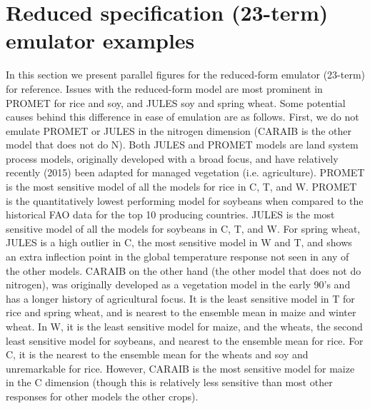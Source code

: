 \documentclass[12pt]{article}
\begin{document}
{{\section{Reduced specification (23-term) emulator examples}
\smallskip
\begin{flushleft}
In this section we present parallel figures for the reduced-form emulator (23-term) for reference. 
Issues with the reduced-form model are most prominent in PROMET for rice and soy, and JULES soy and spring wheat. 
Some potential causes behind this difference in ease of emulation are as follows.
First, we do not emulate PROMET or JULES in the nitrogen dimension (CARAIB is the other model that does not do N). 
Both JULES and PROMET models are land system process models, originally developed with a broad focus, and have relatively recently (2015) been adapted for managed vegetation (i.e. agriculture).
PROMET is the most sensitive model of all the models for rice in C, T, and W. 
PROMET is the quantitatively lowest performing model for soybeans when compared to the historical FAO data for the top 10 producing countries. 
JULES is the most sensitive model of all the models for soybeans in C, T, and W. 
For spring wheat, JULES is a high outlier in C, the most sensitive model in W and T, and shows an extra inflection point in the global temperature response not seen in any of the other models. 
CARAIB on the other hand (the other model that does not do nitrogen), was originally developed as a vegetation model in the early 90's and has a longer history of agricultural focus. It is the least sensitive model in T for rice and spring wheat, and is nearest to the ensemble mean in maize and winter wheat. 
In W, it is the least sensitive model for maize, and the wheats, the second least sensitive model for soybeans, and nearest to the ensemble mean for rice. 
For C, it is the nearest to the ensemble mean for the wheats and soy and unremarkable for rice. 
However, CARAIB is the most sensitive model for maize in the C dimension (though this is relatively less sensitive than most other responses for other models the other crops).
\end{flushleft}

}}
\end{document}
